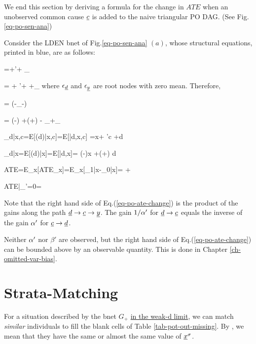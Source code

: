 We end this section by
deriving a formula
for the change in $ATE$
when an unobserved
common cause $\rvc$ is added to the
naive triangular PO DAG.
(See Fig.\ref{eq-po-sen-ana})


Consider the LDEN bnet of Fig.\ref{eq-po-sen-ana} $(a)$,
whose structural equations,
printed in blue, are as follows:


\beq\color{blue}
\rvd=\alp\rvx +\alp'\rvc + \eps_\rvd
\eeq

\beq\color{blue}
\rvy = \beta \rvx + \beta'\rvc + \delta \rvd
+\eps_\rvy
\eeq
where $\eps_\rvd$ and $\eps_\rvy$
are root nodes with zero mean.
Therefore,

\beq
\rvc = (\rvd-\eps_\rvd -\alp\rvx)
\eeq

\beq
\rvy = \left(\beta-\;\right)\rvx
+\left(\delta+\right)
\rvd-
\eps_\rvd +\eps_\rvy
\eeq


\beq
\caly_{d|x,c}=E[\rvy(d)|x,c]=E[\rvy|d,x,c]
=\beta x+ \beta'c +\delta d
\eeq

\beq
\caly_{d|x}=E[\rvy(d)|x]=E[\rvy|d,x]=
\left(\beta-\;\right)x
+\left(\delta+\right)
d
\eeq



\beq
ATE=E_x[ATE_x]=E_x[\caly_{1|x}-\caly_{0|x}]=
\delta+
\eeq

\beq
ATE|_{\beta'=0}=\delta
\eeq

\beq
{}
\label{eq-po-ate-change}
\eeq
Note that the right hand side
of Eq.(\ref{eq-po-ate-change})
is the product of the gains
along the path $\rvd\rarrow \rvc\rarrow\rvy$.
The gain
$1/\alpha'$ for $\rvd\rarrow\rvc$
equals
the inverse of the gain
$\alpha'$ for $\rvc\rarrow\rvd$.

Neither $\alpha'$ nor $\beta'$
are observed, but the right hand side
of Eq.(\ref{eq-po-ate-change})
can be bounded above by
an observable quantity.
This is done in Chapter \ref{ch-omitted-var-bias}.




\section{Strata-Matching}
\label{sec-strata-matching}

For a situation
described by
the bnet $G_{+}$
\ul{ in the weak-d limit},
we can match {\it similar}
individuals to fill the blank cells of
 Table \ref{tab-pot-out-missing}.
By , we mean that
they have the same or almost the same
value of $\rvx^\s$.


